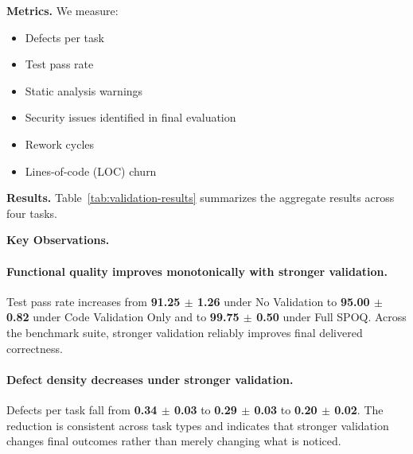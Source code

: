 \textbf{Metrics.}
We measure:

\begin{itemize}
    \item Defects per task
    \item Test pass rate
    \item Static analysis warnings
    \item Security issues identified in final evaluation
    \item Rework cycles
    \item Lines-of-code (LOC) churn
\end{itemize}

\textbf{Results.}
Table~\ref{tab:validation-results} summarizes the aggregate results across four tasks.

\begin{table}[t]
\centering
\caption{Experiment 3 results aggregated across four tasks (mean $\pm$ sd).}
\label{tab:validation-results}
\end{table}

\textbf{Key Observations.}

\paragraph{Functional quality improves monotonically with stronger validation.}
Test pass rate increases from \textbf{91.25 $\pm$ 1.26} under No Validation to \textbf{95.00 $\pm$ 0.82} under Code Validation Only and to \textbf{99.75 $\pm$ 0.50} under Full SPOQ. Across the benchmark suite, stronger validation reliably improves final delivered correctness.

\paragraph{Defect density decreases under stronger validation.}
Defects per task fall from \textbf{0.34 $\pm$ 0.03} to \textbf{0.29 $\pm$ 0.03} to \textbf{0.20 $\pm$ 0.02}. The reduction is consistent across task types and indicates that stronger validation changes final outcomes rather than merely changing what is noticed.

